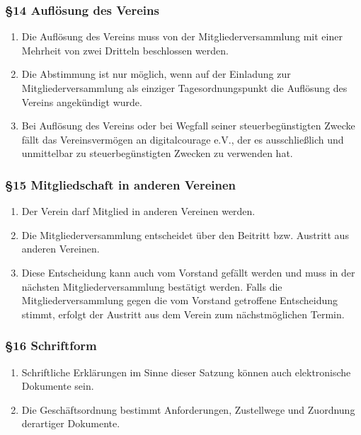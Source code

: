 \documentclass[german]{article}
\begin{document}
\subsubsection*{§14 Auflösung des
Vereins}\label{aufluxf6sung-des-vereins}

\begin{enumerate}
\def\labelenumi{\arabic{enumi}.}
\item
  Die Auflösung des Vereins muss von der Mitgliederversammlung mit einer
  Mehrheit von zwei Dritteln beschlossen werden.
\item
  Die Abstimmung ist nur möglich, wenn auf der Einladung zur
  Mitgliederversammlung als einziger Tagesordnungspunkt die Auflösung
  des Vereins angekündigt wurde.
\item
  Bei Auflösung des Vereins oder bei Wegfall seiner steuerbegünstigten
  Zwecke fällt das Vereinsvermögen an digitalcourage e.V., der es
  ausschließlich und unmittelbar zu steuerbegünstigten Zwecken zu
  verwenden hat.
\end{enumerate}

\subsubsection*{§15 Mitgliedschaft in anderen
Vereinen}\label{mitgliedschaft-in-anderen-vereinen}

\begin{enumerate}
\def\labelenumi{\arabic{enumi}.}
\item
  Der Verein darf Mitglied in anderen Vereinen werden.
\item
  Die Mitgliederversammlung entscheidet über den Beitritt bzw. Austritt
  aus anderen Vereinen.
\item
  Diese Entscheidung kann auch vom Vorstand gefällt werden und muss in
  der nächsten Mitgliederversammlung bestätigt werden. Falls die
  Mitgliederversammlung gegen die vom Vorstand getroffene Entscheidung
  stimmt, erfolgt der Austritt aus dem Verein zum nächstmöglichen
  Termin.
\end{enumerate}

\subsubsection*{§16 Schriftform}\label{schriftform}

\begin{enumerate}
\def\labelenumi{\arabic{enumi}.}
\item
  Schriftliche Erklärungen im Sinne dieser Satzung können auch
  elektronische Dokumente sein.
\item
  Die Geschäftsordnung bestimmt Anforderungen, Zustellwege und Zuordnung
  derartiger Dokumente.
\end{enumerate}
\end{document}
